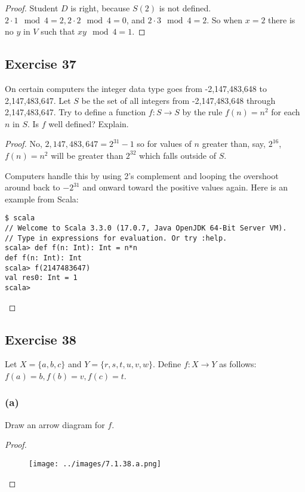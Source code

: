 \documentclass[14pt]{extarticle}
\begin{document}
\begin{proof}
    Student $D$ is right, because $S(2)$ is not defined. \(2 \cdot 1 \mod 4 = 2, 2 \cdot 2 \mod 4 = 0\), and
    \(2 \cdot 3 \mod 4 = 2\). So when $x = 2$ there is no $y$ in $V$ such that \(xy \mod 4 = 1\).
\end{proof}

\subsection{Exercise 37}
On certain computers the integer data type goes from -2,147,483,648 to 2,147,483,647. Let $S$ be the set of
all integers from -2,147,483,648 through 2,147,483,647. Try to define a function \(f: S \to S\) by the rule
\(f(n) = n^2\) for each $n$ in $S$. Is $f$ well defined? Explain.

\begin{proof}
    No, \(2,147,483,647 = 2^{31} - 1\) so for values of $n$ greater than, say, $2^{16}$, \(f(n) = n^2\) will be greater
    than $2^{32}$ which falls outside of $S$.

    Computers handle this by using 2's complement and looping the overshoot around back to \(-2^{31}\) and onward toward
    the positive values again. Here is an example from Scala:

    \begin{verbatim}
$ scala
// Welcome to Scala 3.3.0 (17.0.7, Java OpenJDK 64-Bit Server VM).
// Type in expressions for evaluation. Or try :help.
scala> def f(n: Int): Int = n*n
def f(n: Int): Int
scala> f(2147483647)
val res0: Int = 1
scala>
\end{verbatim}
\end{proof}

\subsection{Exercise 38}
Let \(X = \{a,b,c\}\) and \(Y = \{r,s,t,u,v,w\}\). Define \(f: X \to Y\) as follows: \(f(a) = b, f(b) = v, f(c) = t\).

\subsubsection{(a)}
Draw an arrow diagram for $f$.

\begin{proof}
    \begin{figure}[ht!]
        \centering
        \texttt{[image: ../images/7.1.38.a.png]}
    \end{figure}
\end{proof}
\end{document}
